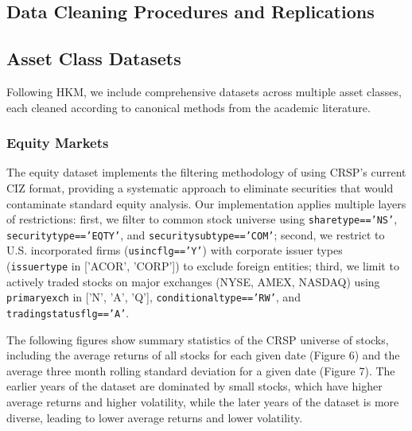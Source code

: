 \documentclass{article}
\begin{document}
\begin{appendices}

\section{Data Cleaning Procedures and Replications}
\label{app:data_cleaning_and_replications}

\subsection{Asset Class Datasets}
\label{sec:asset_classes}

Following HKM, we include comprehensive datasets across multiple asset classes, each cleaned according to canonical methods from the academic literature.

\subsubsection{Equity Markets}
\label{sec:equity}

The equity dataset implements the filtering methodology of \cite{Fama1993} using CRSP's current CIZ format, providing a systematic approach to eliminate securities that would contaminate standard equity analysis. Our implementation applies multiple layers of restrictions: first, we filter to common stock universe using \texttt{sharetype=='NS'}, \texttt{securitytype=='EQTY'}, and \texttt{securitysubtype=='COM'}; second, we restrict to U.S. incorporated firms (\texttt{usincflg=='Y'}) with corporate issuer types (\texttt{issuertype} in ['ACOR', 'CORP']) to exclude foreign entities; third, we limit to actively traded stocks on major exchanges (NYSE, AMEX, NASDAQ) using \texttt{primaryexch} in ['N', 'A', 'Q'], \texttt{conditionaltype=='RW'}, and \texttt{tradingstatusflg=='A'}. 

The following figures show summary statistics of the CRSP universe of stocks, 
including the average returns of all stocks for each given date (Figure 6) 
and the average three month rolling standard deviation for a given date (Figure 7).
The earlier years of the dataset are dominated by small stocks, 
which have higher average returns and higher volatility, while the later years of 
the dataset is more diverse, leading to lower average returns and lower volatility.


\end{appendices}
\end{document}
